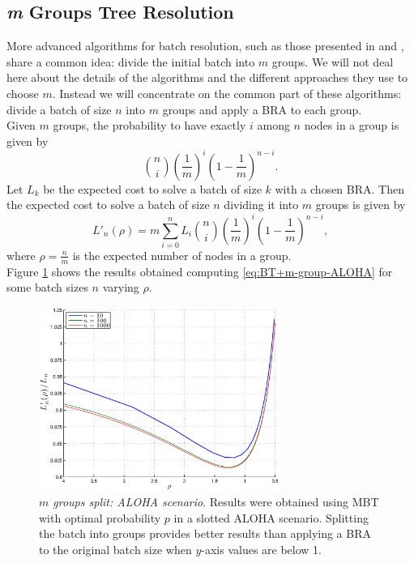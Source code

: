 \documentclass[11pt,a4paper,twoside,openright]{book}
\begin{document}
\subsection{\emph{m} Groups Tree Resolution}
\label{se:mgroups}

More advanced algorithms for batch resolution, such as those presented in \cite{cidon} and \cite{greenberg87}, share a common idea: divide the initial batch into $m$ groups. We will not deal here about the details of the algorithms and the different approaches  they use to choose $m$. Instead we will concentrate on the common part of these algorithms: divide a batch of size $n$ into $m$ groups and apply a BRA to each group.\\
Given $m$ groups, the probability to have exactly $i$ among $n$ nodes in a group is given by
\begin{equation}
{n \choose i} \left(\frac{1}{m}\right)^{i} \left(1-\frac{1}{m}\right)^{n-i}.
\end{equation}
Let $L_{k}$ be the expected cost to solve a batch of size $k$ with a chosen BRA. Then the expected cost to solve a batch of size $n$ dividing it into $m$ groups is given by
\begin{equation}
\label{eq:BT+m-group-ALOHA}
L'_{n}(\rho)=m \sum_{i=0}^{n}L_{i}{n \choose i} \left(\frac{1}{m}\right)^{i} \left(1-\frac{1}{m}\right)^{n-i},
\end{equation}
where $\rho={\displaystyle\frac{n}{m}}$ is the expected number of nodes in a group.\\

\noindent Figure \ref{m-groups-MBT-ALOHA} shows the results obtained computing  \eqref{eq:BT+m-group-ALOHA} for some batch sizes $n$ varying $\rho$.


\begin{figure}[H]
\begin{center}
\includegraphics[width=0.7\textwidth]{matlab/BTs/m-groups-MBT-ALOHA}
\caption[$m$ groups split: ALOHA scenario]{\emph{$m$ groups split: ALOHA scenario}. Results were obtained using MBT with optimal probability $p$ in a slotted ALOHA scenario. Splitting the batch into groups provides better results than applying a BRA to the original batch size when $y$-axis values are below 1.}
\label{m-groups-MBT-ALOHA}
\end{center}
\end{figure}
\end{document}
